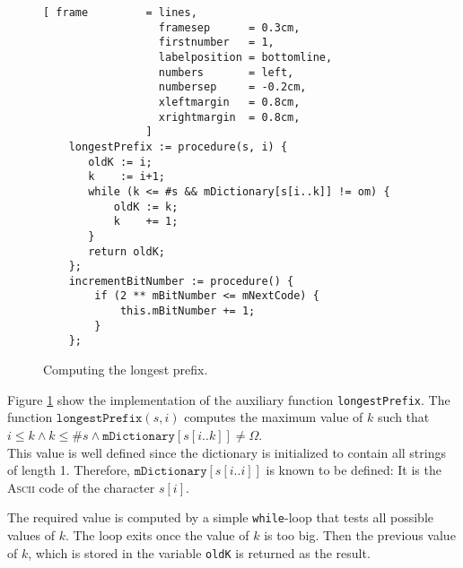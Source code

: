 \begin{figure}[!ht]
\centering
\begin{Verbatim}[ frame         = lines, 
                  framesep      = 0.3cm, 
                  firstnumber   = 1,
                  labelposition = bottomline,
                  numbers       = left,
                  numbersep     = -0.2cm,
                  xleftmargin   = 0.8cm,
                  xrightmargin  = 0.8cm,
                ]
    longestPrefix := procedure(s, i) {
       oldK := i;
       k    := i+1;
       while (k <= #s && mDictionary[s[i..k]] != om) {
           oldK := k;
           k    += 1;
       }
       return oldK;
    };
    incrementBitNumber := procedure() {
        if (2 ** mBitNumber <= mNextCode) {
            this.mBitNumber += 1;
        }
    };
\end{Verbatim}
\vspace*{-0.3cm}
\caption{Computing the longest prefix.}
\label{fig:lzw.stlx-longestPrefix}
\end{figure}
Figure \ref{fig:lzw.stlx-longestPrefix} show the implementation of the auxiliary function
\texttt{longestPrefix}.  
The function $\texttt{longestPrefix}(s, i)$ computes the maximum value of $k$ such that
\\[0.2cm]
\hspace*{1.3cm}
$i \leq k \wedge k \leq \texttt{\#}s \wedge \texttt{mDictionary}[s[i..k]] \not= \Omega$.
\\[0.2cm]
This value is well defined since the dictionary is initialized to contain all strings of
length 1.  Therefore, $\texttt{mDictionary}[s[i..i]]$ is known to be defined: It is the
\textsc{Ascii} code of the character $s[i]$.
      
The required value is computed by a simple \texttt{while}-loop that tests all possible values of $k$.
The loop exits once the value of $k$ is too big.  Then the previous value of $k$, which is
stored in the variable \texttt{oldK} is returned as the result.




